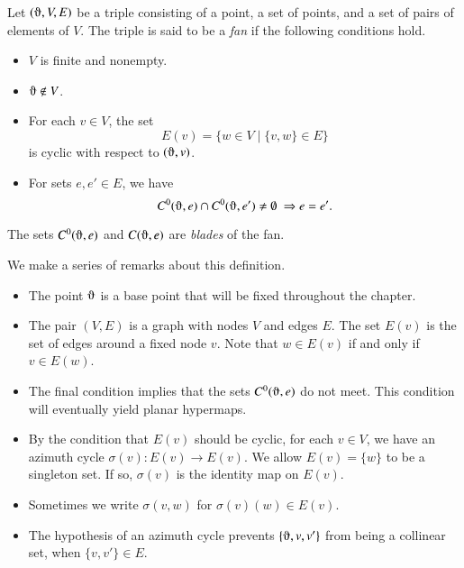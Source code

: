 \begin{definition}  Let $(\orgn,V,E)$ be a triple consisting of a point,
a set of
points, and a set of pairs of elements of $V$.  The triple is said to be
a {\it fan\/} if the following conditions hold.
    \begin{itemize}
    \item $V$ is finite and nonempty.
    \item $\orgn\not\in V$.
    \item For each $v\in V$, the set
        $$
        E(v) = \{w\in V\mid \{v,w\}\in E\}
        $$
        is cyclic with respect to $(\orgn,v)$.
    \item For sets $e,e'\in E$,   we have
        $$C^0(\orgn,e) \cap C^0(\orgn,e')\ne\emptyset\ \Rightarrow e = e'.$$
    \end{itemize}
The sets $C^0(\orgn,e)$ and $C(\orgn,e)$ are {\it blades\/} of the fan.
\end{definition}

We make a series of remarks about this definition.

\begin{remark}
\begin{itemize}
\item The point $\orgn$ is a base point that will be fixed throughout
the chapter.  
\item The pair $(V,E)$ is a graph with nodes $V$ and edges $E$.  The set
$E(v)$ is the set of edges around a fixed node $v$.
Note that $w\in E(v)$ if and only if $v\in E(w)$.   
%
\item The final condition implies that the sets $C^0(\orgn,e)$
do not meet.   This condition will eventually yield planar
hypermaps.
%
\item
By the condition that $E(v)$ should be cyclic,
for each $v\in V$, we have an azimuth cycle $\sigma(v):E(v)\to E(v)$.
We allow $E(v) = \{w\}$ to be a
singleton set. If so,
$\sigma(v)$ is the identity map on $E(v)$.
%
\item
Sometimes we write $\sigma(v,w)$ for $\sigma(v)(w)\in E(v)$.
%
\item 
The hypothesis of an azimuth cycle
prevents $\{\orgn,v,v'\}$ from being a collinear set, when $\{v,v'\}\in
E$.
%
\end{itemize}
\end{remark}



